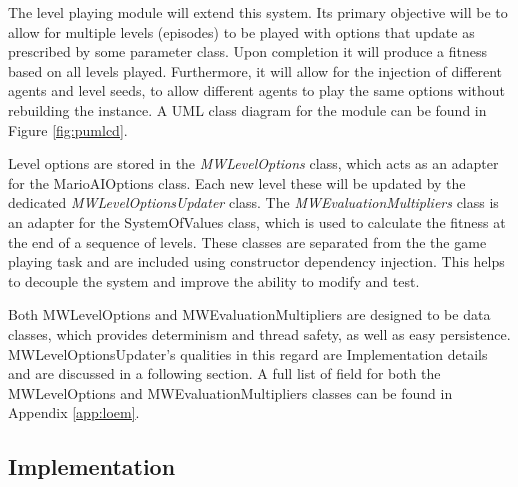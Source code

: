 \vspace{\baselineskip}

The level playing module will extend this system. Its primary objective will be to allow for multiple levels (episodes) to be played with options that update as prescribed by some parameter class. Upon completion it will produce a fitness based on all levels played. Furthermore, it will allow for the injection of different agents and level seeds, to allow different agents to play the same options without rebuilding the instance. A UML class diagram for the module can be found in Figure \ref{fig:pumlcd}.

Level options are stored in the \emph{MWLevelOptions} class, which acts as an adapter for the MarioAIOptions class. Each new level these will be updated by the dedicated \emph{MWLevelOptionsUpdater} class. The \emph{MWEvaluationMultipliers} class is an adapter for the SystemOfValues class, which is used to calculate the fitness at the end of a sequence of levels. These classes are separated from the the game playing task and are included using constructor dependency injection. This helps to decouple the system and improve the ability to modify and test.

Both MWLevelOptions and MWEvaluationMultipliers are designed to be data classes, which provides determinism and thread safety, as well as easy persistence. MWLevelOptionsUpdater's qualities in this regard are Implementation details and are discussed in a following section. A full list of field for both the MWLevelOptions and MWEvaluationMultipliers classes can be found in Appendix \ref{app:loem}.



\subsection{Implementation}

